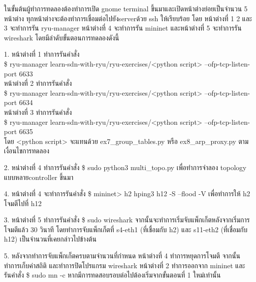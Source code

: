 ในขั้นต้นผู้ทำการทดลองต้องทำการเปิด gnome terminal ขึ้นมาและเปิดหน้าต่างย่อยเป็นจำนวน 5 หน้าต่าง
ทุกหน้าต่างจะต้องทำการเชื่อมต่อไปยัง\gls{server}ด้วย ssh ให้เรียบร้อย
โดย หน้าต่างที่ 1 2 และ 3 จะทำการรัน ryu-manager หน้าต่างที่ 4 จะทำการรัน mininet และหน้าต่างที่ 5 จะทำการรัน wireshark
โดยมีลำดับขั้นตอนการทดลองดังนี้

1. หน้าต่างที่ 1 ทำการรันคำสั่ง \\
\$ ryu-manager learn-sdn-with-ryu/ryu-exercises/<python script> --ofp-tcp-listen-port 6633 \\
\indent หน้าต่างที่ 2 ทำการรันคำสั่ง \\
\$ ryu-manager learn-sdn-with-ryu/ryu-exercises/<python script> --ofp-tcp-listen-port 6634  \\
\indent หน้าต่างที่ 3 ทำการรันคำสั่ง \\
\$ ryu-manager learn-sdn-with-ryu/ryu-exercises/<python script> --ofp-tcp-listen-port 6635  \\
โดย <python script> จะแทนด้วย 
ex7\_group\_tables.py หรือ ex8\_arp\_proxy.py
ตามเงื่อนไขการทดลอง

2. หน่าต่างที่ 4 ทำการรันคำสั่ง    
\$ sudo python3 multi\_topo.py เพื่อทำการจำลอง topology แบบหลาย\gls{controller} ขึ้นมา

4. หน้าต่างที่ 4 จะทำการรันคำสั่ง \$ mininet> h2 hping3 h12 -S --flood -V
เพื่อทำการให้ h2 โจมตีไปที่ h12

3. หน้าต่างที่ 5 ทำการรันคำสั่ง 
\$ sudo wireshark 
จากนั้นจะทำการเริ่มจับแพ็กเก็ตหลังจากเริ่มการโจมตีแล้ว 30 วินาที
โดยทำการจับแพ็กเก็ตที่ s4-eth1 (ที่เชื่อมกับ h2) และ s11-eth2 (ที่เชื่อมกับ h12) เป็นจำนวนที่เคยกล่าวไปข้างต้น

5. หลังจากทำการจับแพ็กเก็ตครบตามจำนวนที่กำหนด หน้าต่างที่ 4 ทำการหยุดการโจมตี จากนั้นทำการเก็บค่าสถิติ และทำการปิดโปรแกรม wireshark
หน้าต่างที่ 2 ทำการออกจาก mininet และรันคำสั่ง \$ sudo mn -c หากมีการทดสอบรอบต่อไปต้องเริ่มจากขั้นตอนที่ 1 ใหม่เท่านั้น
\\\\
